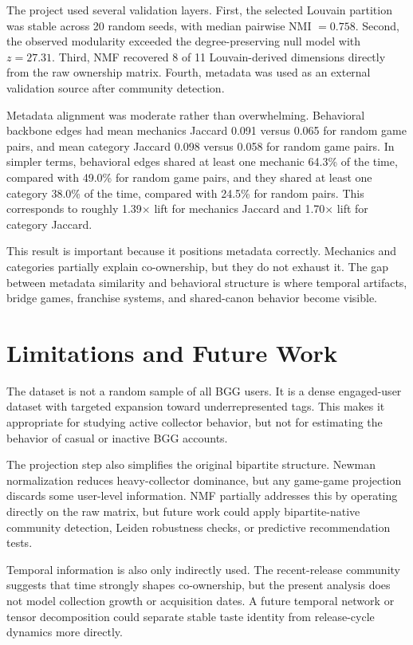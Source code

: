 \documentclass[10pt,twocolumn]{article}
\begin{document}
The project used several validation layers. First, the selected Louvain partition was stable across 20 random seeds, with median pairwise NMI $=0.758$. Second, the observed modularity exceeded the degree-preserving null model with $z=27.31$. Third, NMF recovered 8 of 11 Louvain-derived dimensions directly from the raw ownership matrix. Fourth, metadata was used as an external validation source after community detection.

Metadata alignment was moderate rather than overwhelming. Behavioral backbone edges had mean mechanics Jaccard 0.091 versus 0.065 for random game pairs, and mean category Jaccard 0.098 versus 0.058 for random game pairs. In simpler terms, behavioral edges shared at least one mechanic 64.3\% of the time, compared with 49.0\% for random game pairs, and they shared at least one category 38.0\% of the time, compared with 24.5\% for random pairs. This corresponds to roughly 1.39$\times$ lift for mechanics Jaccard and 1.70$\times$ lift for category Jaccard.

This result is important because it positions metadata correctly. Mechanics and categories partially explain co-ownership, but they do not exhaust it. The gap between metadata similarity and behavioral structure is where temporal artifacts, bridge games, franchise systems, and shared-canon behavior become visible.

\section{Limitations and Future Work}

The dataset is not a random sample of all BGG users. It is a dense engaged-user dataset with targeted expansion toward underrepresented tags. This makes it appropriate for studying active collector behavior, but not for estimating the behavior of casual or inactive BGG accounts.

The projection step also simplifies the original bipartite structure. Newman normalization reduces heavy-collector dominance, but any game-game projection discards some user-level information. NMF partially addresses this by operating directly on the raw matrix, but future work could apply bipartite-native community detection, Leiden robustness checks, or predictive recommendation tests.

Temporal information is also only indirectly used. The recent-release community suggests that time strongly shapes co-ownership, but the present analysis does not model collection growth or acquisition dates. A future temporal network or tensor decomposition could separate stable taste identity from release-cycle dynamics more directly.
\end{document}
